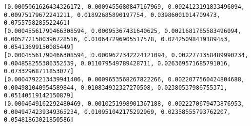 \documentclass[11pt]{article}
\begin{document}
    \begin{Verbatim}[commandchars=\\\{\}]
[0.0005061626434326172, 0.0009455680847167969, 0.0024123191833496094,
0.00975179672241211, 0.01892685890197754, 0.03986001014709473,
0.0755758285522461]
[0.00045561790466308594, 0.00095367431640625, 0.0021681785583496094,
0.0052721500396728516, 0.010647296905517578, 0.02425098419189453,
0.05413699150085449]
[0.00045561790466308594, 0.0009627342224121094, 0.0022771358489990234,
0.004858255386352539, 0.011079549789428711, 0.026369571685791016,
0.07332968711853027]
[0.0004792213439941406, 0.0009653568267822266, 0.0022077560424804688,
0.004981040954589844, 0.010834932327270508, 0.02380537986755371,
0.05140519142150879]
[0.0004649162292480469, 0.0010251998901367188, 0.0022270679473876953,
0.0049474239349365234, 0.010951042175292969, 0.02358555793762207,
0.05481863021850586]
    \end{Verbatim}

    \begin{center}
    \end{center}
    { \hspace*{\fill} \\}
    
    \begin{center}
    \end{center}
    { \hspace*{\fill} \\}
    
    \begin{center}
    \end{center}
    { \hspace*{\fill} \\}
    
    \begin{center}
    \end{center}
    { \hspace*{\fill} \\}
    
    \begin{center}
    \end{center}
    { \hspace*{\fill} \\}
    
\end{document}
